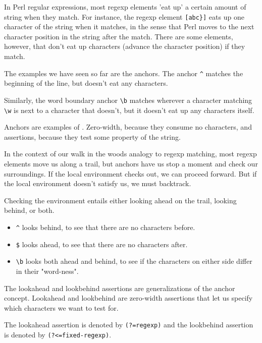 \begin{it}


In Perl regular expressions, most regexp elements 'eat up' a certain
amount of string when they match. For instance, the regexp element
\verb|[abc}]| eats up one character of the string when it matches, in the sense
that Perl moves to the next character position in the string after the
match. There are some elements, however, that don't eat up characters
(advance the character position) if they match. 

The examples we have seen
so far are the anchors. The anchor \verb|^| matches the beginning of the line,
but doesn't eat any characters. 

Similarly, the word boundary anchor
\verb|\b| matches wherever a character matching \verb|\w| is next to a character that
doesn't, but it doesn't eat up any characters itself. 

Anchors are examples
of . Zero-width, because they consume no characters,
and assertions, because they test some property of the string. 

In the
context of our walk in the woods analogy to regexp matching, most regexp
elements move us along a trail, but anchors have us stop a moment and
check our surroundings. If the local environment checks out, we can
proceed forward. But if the local environment doesn't satisfy us, we
must backtrack.

Checking the environment entails either looking ahead on the trail,
looking behind, or both. 

\begin{itemize}
\item
\verb|^| looks behind, to see that there are no
characters before. 
\item
\verb|$| looks ahead, to see that there are no characters
after. 
\item
\verb|\b| looks both ahead and behind, to see if the characters on either
side differ in their "word-ness".
\end{itemize}

The lookahead and lookbehind assertions are generalizations of the anchor
concept. 
Lookahead and lookbehind are zero-width assertions that let us
specify which characters we want to test for. 


The lookahead assertion
is denoted by \verb|(?=regexp)| and the lookbehind assertion is denoted by
\verb|(?<=fixed-regexp)|. 


\end{it}

